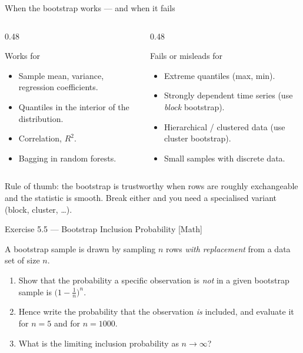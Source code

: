 \documentclass[aspectratio=169,11pt]{beamer}
\begin{document}
\begin{frame}{When the bootstrap works --- and when it fails}
  \begin{columns}[T]
    \begin{column}{0.48\textwidth}
      \begin{block}{Works for}
        \begin{itemize}
          \item Sample mean, variance, regression coefficients.
          \item Quantiles in the interior of the distribution.
          \item Correlation, $R^2$.
          \item Bagging in random forests.
        \end{itemize}
      \end{block}
    \end{column}
    \begin{column}{0.48\textwidth}
      \begin{alertblock}{Fails or misleads for}
        \begin{itemize}
          \item Extreme quantiles (max, min).
          \item Strongly dependent time series (use \emph{block}
                bootstrap).
          \item Hierarchical / clustered data (use cluster bootstrap).
          \item Small samples with discrete data.
        \end{itemize}
      \end{alertblock}
    \end{column}
  \end{columns}
  \begin{takeaway}
    Rule of thumb: the bootstrap is trustworthy when rows are roughly
    exchangeable and the statistic is smooth. Break either and you need
    a specialised variant (block, cluster, \dots).
  \end{takeaway}
\end{frame}

\begin{frame}{Exercise 5.5 --- Bootstrap Inclusion Probability [Math]}
  \begin{exercise}
    A bootstrap sample is drawn by sampling $n$ rows \emph{with
    replacement} from a data set of size $n$.
    \begin{enumerate}
      \item Show that the probability a specific observation is
            \emph{not} in a given bootstrap sample is
            $\bigl(1 - \tfrac1n\bigr)^n$.
      \item Hence write the probability that the observation \emph{is}
            included, and evaluate it for $n = 5$ and for $n = 1000$.
      \item What is the limiting inclusion probability as
            $n \to \infty$?
    \end{enumerate}
  \end{exercise}
\end{frame}
\end{document}
